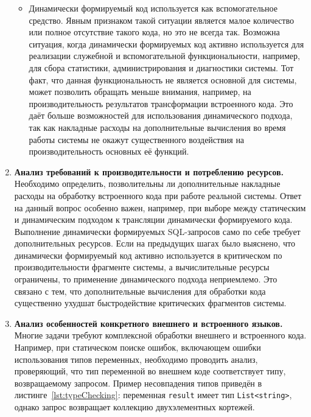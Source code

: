 \begin{enumerate}
\begin{itemize}
    \item Динамически формируемый код используется как вспомогательное средство. Явным признаком такой ситуации является малое количество или полное отсутствие такого кода, но это не всегда так. Возможна ситуация, когда динамически формируемых код активно используется для реализации служебной и вспомогательной функциональности, например, для сбора статистики, администрирования и диагностики системы. Тот факт, что данная функциональность не является основной для системы, может позволить обращать меньше внимания, например, на производительность результатов трансформации встроенного кода. Это даёт больше возможностей для использования динамического подхода, так как накладные расходы на дополнительные вычисления во время работы системы не окажут существенного воздействия на производительность основных её функций.
  \end{itemize}
    
  \item \textbf{Анализ требований к производительности и потреблению ресурсов.} Необходимо определить, позволительны ли дополнительные накладные расходы на обработку встроенного кода при работе реальной системы. Ответ на данный вопрос особенно важен, например, при выборе между статическим и динамическим подходом к трансляции динамически формируемого кода. Выполнение динамически формируемых SQL-запросов само по себе требует дополнительных ресурсов. Если на предыдущих шагах было выяснено, что динамически формируемый код активно используется в критическом по производительности фрагменте системы, а вычислительные ресурсы ограничены, то применение динамического подхода неприемлемо. Это связано с тем, что дополнительные вычисления для обработки кода существенно ухудшат быстродействие критических фрагментов системы.
  
  \item \textbf{Анализ особенностей конкретного внешнего и встроенного языков.} Многие задачи требуют комплексной обработки внешнего и встроенного кода. Например, при статическом поиске ошибок, включающем ошибки использования типов переменных, необходимо проводить анализ, проверяющий, что тип переменной во внешнем коде соответствует типу, возвращаемому запросом. Пример несовпадения типов приведён в листинге~\ref{lst:typeChecking}: переменная \texttt{result} имеет тип \texttt{List<string>}, однако запрос возвращает коллекцию двухэлементных кортежей.
  
\begin{listing}
    \begin{pyglist}[language=csharp,numbers=left,numbersep=5pt]


\end{pyglist}
\end{listing}
\end{enumerate}
